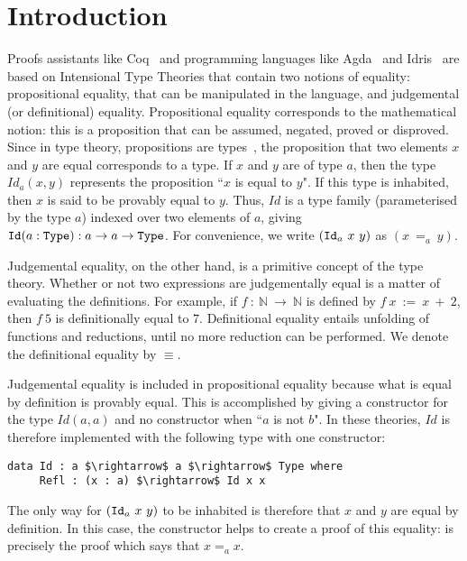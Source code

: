 \section{Introduction}

Proofs assistants like Coq~\cite{BertotC04} 
and programming languages like 
Agda~\cite{DBLP:conf/tldi/Norell09} and
Idris~\cite{brady2013idris} are based on Intensional Type Theories that contain
two notions of equality: propositional equality, that can be
manipulated in the language, and judgemental (or definitional) equality.
Propositional equality corresponds to the mathematical notion: this is
a proposition that can be assumed, negated, proved or disproved. Since in type
theory, propositions are types~\cite{How80}, the proposition that two
elements $x$ and $y$ are equal corresponds to a type.
If $x$ and $y$ are of type $a$, then the type
$Id_a(x, y)$ represents the proposition ``$x$ is equal to $y$". If this type is
inhabited, then $x$ is said to be provably equal to $y$. Thus, $Id$ is a type family (parameterised by the type $a$) indexed over two elements of $a$, giving ${\mbox{\texttt{Id}}} (a:{\mbox{\texttt{Type}}}):a \rightarrow a \rightarrow {\mbox{\texttt{Type}}}$. For
convenience, we write $(\code{Id}_a\ x\ y)$ as $(x\ =_a\ y)$. 

Judgemental equality, on the other hand, is a primitive concept of
the type theory.
Whether or not two expressions are judgementally equal is a matter of
evaluating the definitions. For example, if $f\ :\ \mathbb{N}\ \rightarrow\
\mathbb{N}$ is defined by $f\ x\ :=\ x\ +\ 2$, then $f\ 5$ is
definitionally equal to $7$. Definitional equality entails unfolding
of functions and reductions, until no more reduction can be
performed. We denote the definitional equality by $\equiv$.

Judgemental equality is included in propositional equality
because what is equal by definition is provably equal. This is
accomplished by giving a constructor for the type $Id(a,a)$ and no
constructor when ``$a$ is not $b$".  In these theories, $Id$ is therefore
implemented with the following type with one constructor:

\begin{lstlisting}
data Id : a $\rightarrow$ a $\rightarrow$ Type where
     Refl : (x : a) $\rightarrow$ Id x x
\end{lstlisting}

The only way for $(\code{Id}_a\ x\ y)$ to be inhabited is therefore that $x$ and $y$ are equal by definition. In this case, the constructor  helps to create a proof of this equality:  is precisely the proof
which says that $x=_ax$. 

